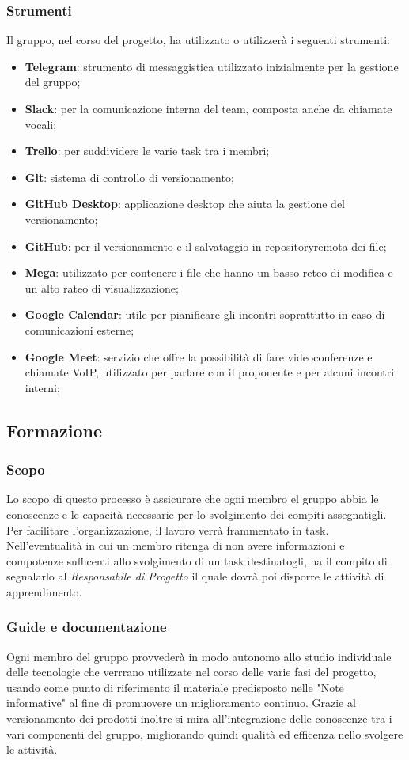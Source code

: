 		\subsubsection{Strumenti}
		Il gruppo, nel corso del progetto, ha utilizzato o utilizzerà i seguenti strumenti:
		\begin{itemize}
			\item \textbf{Telegram\glo}: strumento di messaggistica utilizzato inizialmente per la gestione del gruppo;
			\item \textbf{Slack\glo}: per la comunicazione interna del team, composta anche da chiamate vocali;
			\item \textbf{Trello\glo}: per suddividere le varie task tra i membri;
			\item \textbf{Git}: sistema di controllo di versionamento;
			\item \textbf{GitHub Desktop}: applicazione desktop che aiuta la gestione del versionamento;
			\item \textbf{GitHub}\glo: per il versionamento e il salvataggio in repository\glosp remota dei file;
			\item \textbf{Mega}: utilizzato per contenere i file che hanno un basso reteo di modifica e un alto rateo di visualizzazione;
			\item \textbf{Google Calendar}: utile per pianificare gli incontri soprattutto in caso di comunicazioni esterne;
			\item \textbf{Google Meet}: servizio che offre la possibilità di fare videoconferenze e chiamate VoIP, utilizzato per parlare con il proponente e per alcuni incontri interni;
		\end{itemize}
	\subsection{Formazione}
	\subsubsection{Scopo}
	Lo scopo di questo processo è assicurare che ogni membro el gruppo abbia le conoscenze e le capacità necessarie per lo svolgimento dei compiti assegnatigli. Per facilitare l'organizzazione, il lavoro verrà frammentato in task. Nell'eventualità in cui un membro ritenga di non avere informazioni e compotenze sufficenti allo svolgimento di un task destinatogli, ha il compito di segnalarlo al \textit{Responsabile di Progetto} il quale dovrà poi disporre le attività di apprendimento.
	\subsubsection{Guide e documentazione}
	Ogni membro del gruppo provvederà in modo autonomo allo studio individuale delle tecnologie che verrrano utilizzate nel corso delle varie fasi del progetto, usando come punto di riferimento il materiale predisposto nelle "Note informative" al fine di promuovere un miglioramento continuo. Grazie al versionamento dei prodotti inoltre si mira all'integrazione delle conoscenze tra i vari componenti del gruppo, migliorando quindi qualità ed efficenza nello svolgere le attività.
